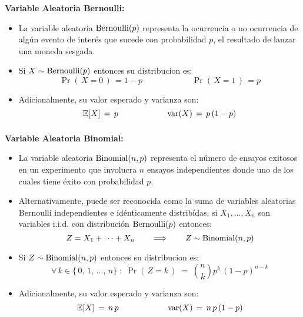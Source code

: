\documentclass[ 10pt, xcolor = dvipsnames]{beamer}
\begin{document}
\begin{frame}[allowframebreaks]
\frametitle{\insertsection}

\textbf{Variable Aleatoria Bernoulli:}
\begin{itemize}
\item La variable aleatoria $\text{Bernoulli}(p)$ representa la ocurrencia o no ocurrencia \linebreak de alg\'un evento de inter\'es que sucede con probabilidad $p$, \eg el resultado de lanzar una moneda sesgada. 
\item Si $X \sim \text{Bernoulli}(p)$ entonces su distribucion es: 
\[
\Pr( \, X = 0 \, ) \, = 1 - p \qquad \qquad \qquad
\Pr( \, X = 1 \, ) \, = p
\]
\item Adicionalmente, su valor esperado y varianza son: 
\[
\mathbb{E}[X] \, = \, p \qquad \qquad \qquad
\text{var}(X) \, = \, p \, (1-p)
\]
\end{itemize}

\end{frame}

\begin{frame}[allowframebreaks]
\frametitle{\insertsection}

\textbf{Variable Aleatoria Binomial:}
\begin{itemize}
\item La variable aleatoria $\text{Binomial}(n,p)$ representa el n\'umero de ensayos exitosos en un experimento que involucra $n$ ensayos independientes donde uno de los cuales tiene \'exito con probabilidad $p$. 
\item Alternativamente, puede ser reconocida como la suma de variables aleatorias Bernoulli independientes e id\'enticamente distrib\'idas. \Ie si $X_1, \dots, X_n$ son variables i.i.d. con distribuci\'on $\text{Bernoulli}(p)$ entonces: 
\[
Z = X_1 + \cdots + X_n \qquad \Longrightarrow \qquad
Z \sim \text{Binomial}(n,p)
\]
\framebreak
\item Si $Z \sim \text{Binomial}(n,p)$ entonces su distribucion es: 
\[
\forall \, k \in \{ \, 0, \, 1, \, \dots, \, n \} \; \colon \;
\Pr( \, Z = k \, ) \; = \; {n \choose k} p^k \, (1-p)^{n-k}
\]
\item Adicionalmente, su valor esperado y varianza son: 
\[
\mathbb{E}[X] \, = \, n \, p \qquad \qquad \qquad
\text{var}(X) \, = \, n \, p \, (1-p)
\]
\end{itemize}

\end{frame}
\end{document}

